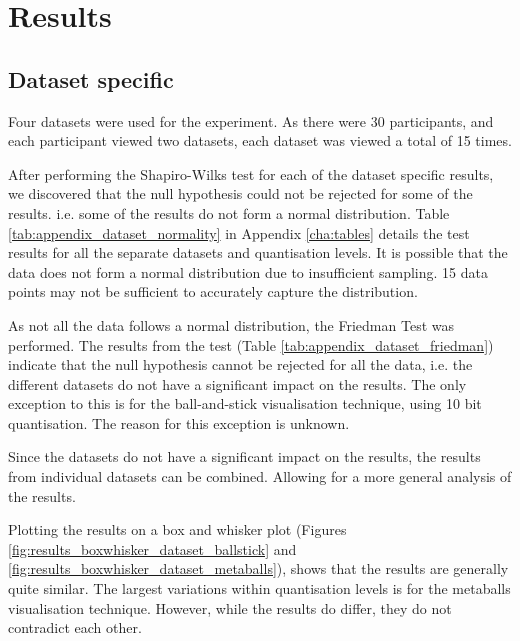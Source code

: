 
\section{Results}
\label{sec:results_results}

\subsection*{Dataset specific}
\label{sub:results_results_dataset}

Four datasets were used for the experiment. As there were 30 participants, and
each participant viewed two datasets, each dataset was viewed a total of 15
times.

After performing the Shapiro-Wilks test for each of the dataset specific
results, we discovered that the null hypothesis could not be rejected for some
of the results. i.e. some of the results do not form a normal distribution.
Table \ref{tab:appendix_dataset_normality} in Appendix \ref{cha:tables} details
the test results for all the separate datasets and quantisation levels. It is
possible that the data does not form a normal distribution due to insufficient
sampling. 15 data points may not be sufficient to accurately capture the
distribution.

As not all the data follows a normal distribution, the Friedman Test was
performed. The results from the test (Table
\ref{tab:appendix_dataset_friedman}) indicate that the null hypothesis cannot
be rejected for all the data, i.e. the different datasets do not have a
significant impact on the results. The only exception to this is for the
ball-and-stick visualisation technique, using 10 bit quantisation. The reason
for this exception is unknown.

Since the datasets do not have a significant impact on the results, the results
from individual datasets can be combined. Allowing for a more general analysis
of the results.

Plotting the results on a box and whisker plot (Figures
\ref{fig:results_boxwhisker_dataset_ballstick} and
\ref{fig:results_boxwhisker_dataset_metaballs}), shows that the results are
generally quite similar. The largest variations within quantisation levels is
for the metaballs visualisation technique. However, while the results do
differ, they do not contradict each other.

